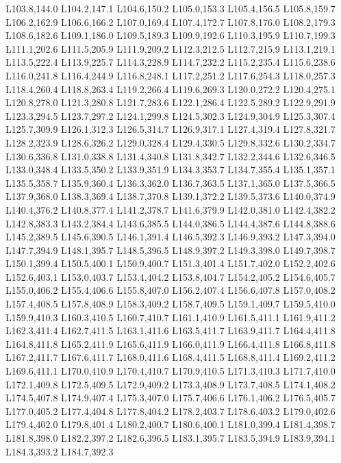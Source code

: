 		L103.8,144.0 L104.2,147.1 L104.6,150.2 L105.0,153.3 L105.4,156.5 L105.8,159.7 L106.2,162.9 L106.6,166.2
		L107.0,169.4 L107.4,172.7 L107.8,176.0 L108.2,179.3 L108.6,182.6 L109.1,186.0 L109.5,189.3 L109.9,192.6
		L110.3,195.9 L110.7,199.3 L111.1,202.6 L111.5,205.9 L111.9,209.2 L112.3,212.5 L112.7,215.9 L113.1,219.1
		L113.5,222.4 L113.9,225.7 L114.3,228.9 L114.7,232.2 L115.2,235.4 L115.6,238.6 L116.0,241.8 L116.4,244.9
		L116.8,248.1 L117.2,251.2 L117.6,254.3 L118.0,257.3 L118.4,260.4 L118.8,263.4 L119.2,266.4 L119.6,269.3
		L120.0,272.2 L120.4,275.1 L120.8,278.0 L121.3,280.8 L121.7,283.6 L122.1,286.4 L122.5,289.2 L122.9,291.9
		L123.3,294.5 L123.7,297.2 L124.1,299.8 L124.5,302.3 L124.9,304.9 L125.3,307.4 L125.7,309.9 L126.1,312.3
		L126.5,314.7 L126.9,317.1 L127.4,319.4 L127.8,321.7 L128.2,323.9 L128.6,326.2 L129.0,328.4 L129.4,330.5
		L129.8,332.6 L130.2,334.7 L130.6,336.8 L131.0,338.8 L131.4,340.8 L131.8,342.7 L132.2,344.6 L132.6,346.5
		L133.0,348.4 L133.5,350.2 L133.9,351.9 L134.3,353.7 L134.7,355.4 L135.1,357.1 L135.5,358.7 L135.9,360.4
		L136.3,362.0 L136.7,363.5 L137.1,365.0 L137.5,366.5 L137.9,368.0 L138.3,369.4 L138.7,370.8 L139.1,372.2
		L139.5,373.6 L140.0,374.9 L140.4,376.2 L140.8,377.4 L141.2,378.7 L141.6,379.9 L142.0,381.0 L142.4,382.2
		L142.8,383.3 L143.2,384.4 L143.6,385.5 L144.0,386.5 L144.4,387.6 L144.8,388.6 L145.2,389.5 L145.6,390.5
		L146.1,391.4 L146.5,392.3 L146.9,393.2 L147.3,394.0 L147.7,394.9 L148.1,395.7 L148.5,396.5 L148.9,397.2
		L149.3,398.0 L149.7,398.7 L150.1,399.4 L150.5,400.1 L150.9,400.7 L151.3,401.4 L151.7,402.0 L152.2,402.6
		L152.6,403.1 L153.0,403.7 L153.4,404.2 L153.8,404.7 L154.2,405.2 L154.6,405.7 L155.0,406.2 L155.4,406.6
		L155.8,407.0 L156.2,407.4 L156.6,407.8 L157.0,408.2 L157.4,408.5 L157.8,408.9 L158.3,409.2 L158.7,409.5
		L159.1,409.7 L159.5,410.0 L159.9,410.3 L160.3,410.5 L160.7,410.7 L161.1,410.9 L161.5,411.1 L161.9,411.2
		L162.3,411.4 L162.7,411.5 L163.1,411.6 L163.5,411.7 L163.9,411.7 L164.4,411.8 L164.8,411.8 L165.2,411.9
		L165.6,411.9 L166.0,411.9 L166.4,411.8 L166.8,411.8 L167.2,411.7 L167.6,411.7 L168.0,411.6 L168.4,411.5
		L168.8,411.4 L169.2,411.2 L169.6,411.1 L170.0,410.9 L170.4,410.7 L170.9,410.5 L171.3,410.3 L171.7,410.0
		L172.1,409.8 L172.5,409.5 L172.9,409.2 L173.3,408.9 L173.7,408.5 L174.1,408.2 L174.5,407.8 L174.9,407.4
		L175.3,407.0 L175.7,406.6 L176.1,406.2 L176.5,405.7 L177.0,405.2 L177.4,404.8 L177.8,404.2 L178.2,403.7
		L178.6,403.2 L179.0,402.6 L179.4,402.0 L179.8,401.4 L180.2,400.7 L180.6,400.1 L181.0,399.4 L181.4,398.7
		L181.8,398.0 L182.2,397.2 L182.6,396.5 L183.1,395.7 L183.5,394.9 L183.9,394.1 L184.3,393.2 L184.7,392.3
